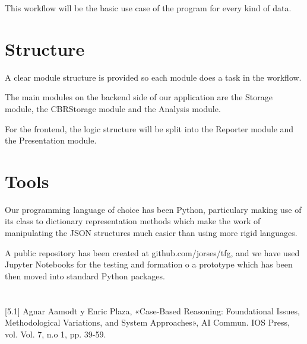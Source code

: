 This workflow will be the basic use case of the program for every kind of data.

\section{Structure}
\label{cap1:sec:structure}
A clear module structure is provided so each module does a task in the workflow.

The main modules on the backend side of our application are the Storage module, the CBRStorage module and the Analysis module.

For the frontend, the logic structure will be split into the Reporter module and the Presentation module.

\section{Tools}
\label{cap1:sec:tools}

Our programming language of choice has been Python, particulary making use of its class to dictionary representation methods which make the work of manipulating the JSON structures much easier than using more rigid languages.

A public repository has been created at github.com/jorses/tfg, and we have used Jupyter Notebooks for the testing and formation o a prototype which has been then moved into standard Python packages.

\section*{\NotasBibliograficas}
\TocNotasBibliograficas

[5.1] Agnar Aamodt y Enric Plaza, «Case-Based Reasoning: Foundational Issues, Methodological Variations, and System Approaches», AI Commun. IOS Press, vol. Vol. 7, n.o 1, pp. 39-59.

